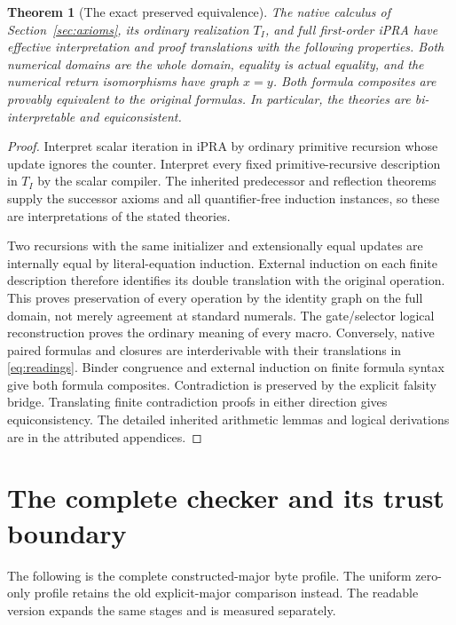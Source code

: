\documentclass[11pt,letterpaper]{article}
\newtheorem{theorem}{Theorem}[section]
\theoremstyle{definition}\newtheorem{definition}[theorem]{Definition}
\theoremstyle{remark}\newtheorem{remark}[theorem]{Remark}
\begin{document}
\begin{theorem}[The exact preserved equivalence]
The native calculus of Section~\ref{sec:axioms}, its ordinary realization
$T_I$, and full first-order iPRA have effective interpretation and proof
translations with the following properties. Both numerical domains are the
whole domain, equality is actual equality, and the numerical return
isomorphisms have graph $x=y$. Both formula composites are provably
equivalent to the original formulas. In particular, the theories are
bi-interpretable and equiconsistent.
\end{theorem}
\begin{proof}
Interpret scalar iteration in iPRA by ordinary primitive recursion whose
update ignores the counter. Interpret every fixed primitive-recursive
description in $T_I$ by the scalar compiler. The inherited predecessor and
reflection theorems supply the successor axioms and all quantifier-free
induction instances, so these are interpretations of the stated theories.

Two recursions with the same initializer and extensionally equal updates
are internally equal by literal-equation induction. External induction on
each finite description therefore identifies its double translation with
the original operation. This proves preservation of every operation by
the identity graph on the full domain, not merely agreement at standard
numerals. The gate/selector logical reconstruction proves the ordinary
meaning of every macro. Conversely, native paired formulas and closures
are interderivable with their translations in \eqref{eq:readings}.
Binder congruence and external induction on finite formula syntax give
both formula composites. Contradiction is preserved by the explicit
falsity bridge. Translating finite contradiction proofs in either direction
gives equiconsistency. The detailed inherited arithmetic lemmas and
logical derivations are in the attributed appendices.
\end{proof}



\section{The complete checker and its trust boundary}
\label{sec:checker}

The following is the complete constructed-major byte profile. The uniform
zero-only profile retains the old explicit-major comparison instead.
The readable version expands the same stages and is measured separately.
\end{document}
